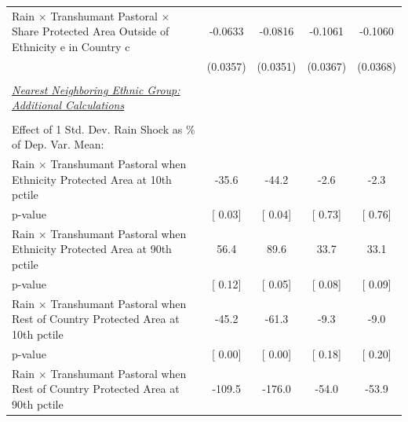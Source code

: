{\begin{tabular}{l*{4}{c}}
\addlinespace
\hspace{15pt} Rain $\times$ Transhumant Pastoral $\times$ Share Protected Area Outside of Ethnicity e in Country c&     -0.0633\sym{*}  &     -0.0816\sym{**} &     -0.1061\sym{***}&     -0.1060\sym{***}\\
                    &    (0.0357)         &    (0.0351)         &    (0.0367)         &    (0.0368)         \\
\midrule
\\ \underline{\emph{Nearest Neighboring Ethnic Group: Additional Calculations}} &                     &                     &                     &                     \\
\\  Effect of 1 Std. Dev. Rain Shock as $\%$ of Dep. Var. Mean:&                     &                     &                     &                     \\
[1em] \hspace{15pt} Rain $\times$ Transhumant Pastoral when Ethnicity Protected Area  at 10th pctile&       -35.6         &       -44.2         &        -2.6         &        -2.3         \\
\hspace{25pt} p-value& [     0.03]         & [     0.04]         & [     0.73]         & [     0.76]         \\
[1em]\hspace{15pt} Rain $\times$ Transhumant Pastoral when Ethnicity Protected Area at 90th pctile&        56.4         &        89.6         &        33.7         &        33.1         \\
\hspace{25pt} p-value& [     0.12]         & [     0.05]         & [     0.08]         & [     0.09]         \\
[1em] \hspace{15pt} Rain $\times$ Transhumant Pastoral when Rest of Country Protected Area  at 10th pctile&       -45.2         &       -61.3         &        -9.3         &        -9.0         \\
\hspace{25pt} p-value& [     0.00]         & [     0.00]         & [     0.18]         & [     0.20]         \\
[1em]\hspace{15pt} Rain $\times$ Transhumant Pastoral when Rest of Country Protected Area  at 90th pctile&      -109.5         &      -176.0         &       -54.0         &       -53.9         \\

\end{tabular}}
